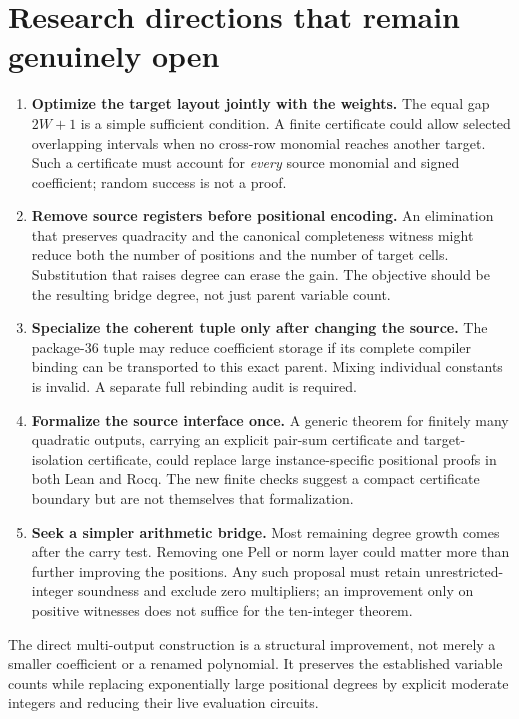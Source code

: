 \documentclass[11pt]{article}
\begin{document}
\section{Research directions that remain genuinely open}
\begin{enumerate}
\item \textbf{Optimize the target layout jointly with the weights.}
The equal gap $2W+1$ is a simple sufficient condition. A finite certificate
could allow selected overlapping intervals when no cross-row monomial reaches
another target. Such a certificate must account for \emph{every} source
monomial and signed coefficient; random success is not a proof.
\item \textbf{Remove source registers before positional encoding.}
An elimination that preserves quadracity and the canonical completeness
witness might reduce both the number of positions and the number of target
cells. Substitution that raises degree can erase the gain. The objective
should be the resulting bridge degree, not just parent variable count.
\item \textbf{Specialize the coherent tuple only after changing the source.}
The package-36 tuple may reduce coefficient storage if its complete compiler
binding can be transported to this exact parent. Mixing individual constants
is invalid. A separate full rebinding audit is required.
\item \textbf{Formalize the source interface once.}
A generic theorem for finitely many quadratic outputs, carrying an explicit
pair-sum certificate and target-isolation certificate, could replace large
instance-specific positional proofs in both Lean and Rocq. The new finite
checks suggest a compact certificate boundary but are not themselves that
formalization.
\item \textbf{Seek a simpler arithmetic bridge.}
Most remaining degree growth comes after the carry test. Removing one Pell
or norm layer could matter more than further improving the positions.
Any such proposal must retain unrestricted-integer soundness and exclude
zero multipliers; an improvement only on positive witnesses does not suffice
for the ten-integer theorem.
\end{enumerate}
The direct multi-output construction is a structural improvement, not merely
a smaller coefficient or a renamed polynomial. It preserves the established
variable counts while replacing exponentially large positional degrees by
explicit moderate integers and reducing their live evaluation circuits.
\end{document}
